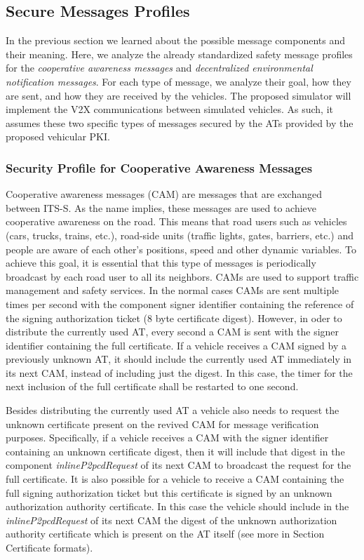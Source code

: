 \subsection{Secure Messages Profiles}
In the previous section we learned about the possible message components and their meaning. Here, we analyze the already standardized safety message profiles for the \textit{cooperative awareness messages} and \textit{decentralized environmental notification messages}. For each type of message, we analyze their goal, how they are sent, and how they are received by the vehicles. The proposed simulator will implement the V2X communications between simulated vehicles. As such, it assumes these two specific types of messages secured by the ATs provided by the proposed vehicular PKI.

\subsubsection{Security Profile for Cooperative Awareness Messages}
Cooperative awareness messages (CAM) are messages that are exchanged between ITS-S. As the name implies, these messages are used to achieve cooperative awareness on the road. This means that road users such as vehicles (cars, trucks, trains, etc.), road-side units (traffic lights, gates, barriers, etc.) and people are aware of each other's positions, speed and other dynamic variables. To achieve this goal, it is essential that this type of messages is periodically broadcast by each road user to all its neighbors. CAMs are used to support traffic management and safety services. In the normal cases CAMs are sent multiple times per second with the component signer identifier containing the reference of the signing authorization ticket (8 byte certificate digest). However, in oder to distribute the currently used AT, every second a CAM is sent with the signer identifier containing the full certificate. If a vehicle receives a CAM signed by a previously unknown AT, it should include the currently used AT immediately in its next CAM, instead of including just the digest. In this case, the timer for the next inclusion of the full certificate shall be restarted to one second. 

Besides distributing the currently used AT a vehicle also needs to request the unknown certificate present on the revived CAM for message verification purposes. Specifically, if a vehicle receives a CAM with the signer identifier containing an unknown certificate digest, then it will include that digest in the component \textit{inlineP2pcdRequest} of its next CAM to broadcast the request for the full certificate. 
It is also possible for a vehicle to receive a CAM containing the full signing authorization ticket but this certificate is signed by an unknown authorization authority certificate. In this case the vehicle should include in the \textit{inlineP2pcdRequest} of its next CAM the digest of the unknown authorization authority certificate which is present on the AT itself (see more in Section Certificate formats).

